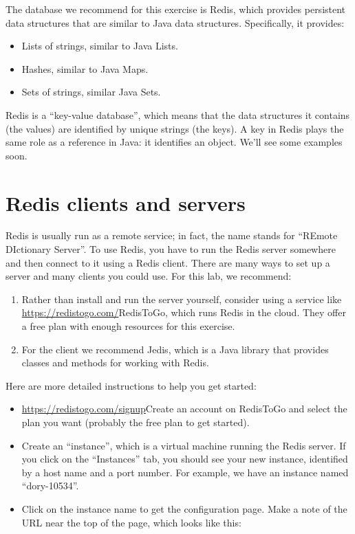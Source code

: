 \documentclass[12pt]{book}
\theoremstyle{exercise}
\begin{document}
{The database we recommend for this exercise is Redis, which provides
persistent data structures that are similar to Java data structures.
Specifically, it provides:

\begin{itemize}
\itemsep1pt\parskip0pt
\item
  Lists of strings, similar to Java Lists.
\item
  Hashes, similar to Java Maps.
\item
  Sets of strings, similar Java Sets.
\end{itemize}

Redis is a ``key-value database'', which means that the data structures
it contains (the values) are identified by unique strings (the keys). A
key in Redis plays the same role as a reference in Java: it identifies
an object. We'll see some examples soon.

\section{Redis clients and servers}\label{redis-clients-and-servers}

Redis is usually run as a remote service; in fact, the name stands for
``REmote DIctionary Server''. To use Redis, you have to run the Redis
server somewhere and then connect to it using a Redis client. There are
many ways to set up a server and many clients you could use. For this
lab, we recommend:

\begin{enumerate}
\def\labelenumi{\arabic{enumi}.}
\item
  Rather than install and run the server yourself, consider using a
  service like \url{https://redistogo.com/}{RedisToGo}, which runs
  Redis in the cloud. They offer a free plan with enough resources for
  this exercise.
\item
  For the client we recommend Jedis, which is a Java library that
  provides classes and methods for working with Redis.
\end{enumerate}

Here are more detailed instructions to help you get started:

\begin{itemize}
\item
  \url{https://redistogo.com/signup}{Create an account on RedisToGo}
  and select the plan you want (probably the free plan to get started).
\item
  Create an ``instance'', which is a virtual machine running the Redis
  server. If you click on the ``Instances'' tab, you should see your new
  instance, identified by a host name and a port number. For example, we
  have an instance named ``dory-10534''.
\item
  Click on the instance name to get the configuration page. Make a note
  of the URL near the top of the page, which looks like this:


\end{itemize}}
\end{document}
